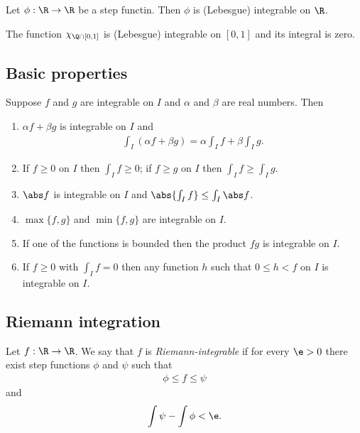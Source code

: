 \documentclass{article}
\begin{document}
\begin{corollary}
	Let $\phi:\R\to\R$ be a step functin. Then $\phi$ is (Lebesgue) integrable on $\R$.
\end{corollary}

\begin{corollary}
	The function $\chi_{\Q\cap[0,1]}$ is (Lebesgue) integrable on $[0,1]$ and its integral is zero.
\end{corollary}

\subsection{Basic properties}

\begin{theorem}[Notes 4.2]
	Suppose $f$ and $g$ are integrable on $I$ and $\alpha$ and $\beta$ are real numbers. Then
	\begin{enumerate}
		\item $\alpha f + \beta g$ is integrable on $I$ and \begin{align*}
			      \int_I (\alpha f + \beta g) = \alpha \int_I f + \beta \int_I g.
		      \end{align*}
		\item If $f\geq 0$ on $I$ then $\int_I f \geq 0$; if $f\geq g$ on $I$ then $\int_I f\geq \int_I g$.
		\item $\abs f$ is integrable on $I$ and $\abs{\int_I f}\leq \int_I \abs f$.
		\item $\max\{f,g\}$ and $\min\{f,g\}$ are integrable on $I$.
		\item If one of the functions is bounded then the product $fg$ is integrable on $I$.
		\item If $f\geq 0$ with $\int_I f = 0$ then any function $h$ such that $0\leq h<f$ on $I$ is integrable on $I$.
	\end{enumerate}
\end{theorem}

\subsection{Riemann integration}

\begin{definition}[Notes 4.4]
	Let $f:\R\to\R$. We say that $f$ is \emph{Riemann-integrable} if for every
	$\e>0$ there exist step functions $\phi$ and $\psi$ such that
	\begin{align*}
		\phi \leq f \leq \psi
	\end{align*}
	and
	\begin{align*}
		\int \psi - \int \phi < \e.
	\end{align*}
\end{definition}
\end{document}
